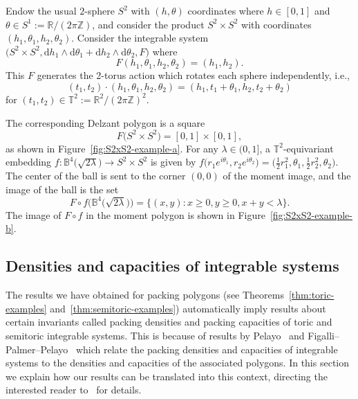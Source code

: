 \documentclass[pdftex]{sigma}
\numberwithin{equation}{section}
\def\R{{\mathbb R}}
\def\Z{{\mathbb Z}}
\begin{document}
\begin{example}
Endow the usual $2$-sphere $S^2$ with $(h,\theta)$ coordinates where $h\in [0,1]$ and $\theta\in S^1 := \R/ (2\pi \Z)$,
and consider the product $S^2\times S^2$ with coordinates $(h_1, \theta_1, h_2, \theta_2)$.
Consider the integrable system $\big(S^2 \times S^2, \mathrm{d} h_1 \wedge \mathrm{d} \theta_1 + \mathrm{d} h_2 \wedge \mathrm{d}\theta_2, F\big)$ where
\[
 F(h_1, \theta_1, h_2, \theta_2) = (h_1,h_2).
\]
This $F$ generates the 2-torus action which rotates each sphere independently, i.e.,
\[(t_1,t_2) \cdot (h_1, \theta_1, h_2, \theta_2) = (h_1,t_1+ \theta_1, h_2, t_2 +\theta_2) \]
for $(t_1,t_2)\in\mathbb{T}^2:= \R^2/(2\pi \mathbb{Z})^2$.



The corresponding Delzant polygon is a square
\[F\big(S^2\times S^2\big) = [0, 1] \times [0,1],\]
as shown in Figure~\ref{fig:S2xS2-example-a}.
For any $\lambda\in(0,1]$, a $\mathbb{T}^2$-equivariant embedding $f\colon \mathbb{B}^4\big(\sqrt{2\lambda}\big)\to S^2\times S^2$
is given by $f\big(r_1e^{i\theta_1},r_2e^{i\theta_2}\big) = \big(\frac{1}{2}r_1^2, \theta_1, \frac{1}{2}r_2^2, \theta_2\big)$.
The center of the ball is sent to the corner $(0,0)$ of the moment image, and the image of the ball is the set
\[F\circ f\big(\mathbb{B}^4\big(\sqrt{2\lambda}\big)\big) = \{(x,y)\colon x \geq 0, y \geq 0, x+y < \lambda\}.\]
The image of $F\circ f$ in the moment polygon is shown in Figure~\ref{fig:S2xS2-example-b}.
\end{example}

\subsection{Densities and capacities of integrable systems}
\label{sec:capacities}






The results we have obtained for packing polygons (see Theorems~\ref{thm:toric-examples} and~\ref{thm:semitoric-examples}) automatically imply results about certain invariants called packing densities and packing capacities of toric and semitoric integrable systems.
This is because of results by Pelayo~\cite{Pe2006} and Figalli--Palmer--Pelayo~\cite{FiPaPe2016} which relate the packing densities and capacities of integrable systems to the densities and capacities of the associated polygons.
In this section we explain how our results can be translated into this context, directing the interested reader to~\cite{FiPaPe2016} for details.
\end{document}
